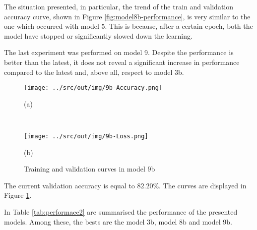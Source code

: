 \documentclass[a4paper,12pt]{article} %
\begin{document}
	The situation presented, in particular, the trend of the train and 
	validation accuracy curve, shown in Figure \ref{fig:model8b-performance}, 
	is very similar to the one which occurred with model 5. This is because, 
	after a certain epoch, both the model have stopped or significantly slowed 
	down the learning.
	\newline

	The last experiment was performed on model 9. Despite the performance is 
	better than the latest, it does not reveal a significant increase in 
	performance compared to the latest and, above all, respect to model 3b. 
			
	\begin{figure}[htb]
		\begin{minipage}[c]{.49\textwidth}
			\centering
			\texttt{[image: ../src/out/img/9b-Accuracy.png]}
			\caption*{(a)}
		\end{minipage}
		~
		\begin{minipage}[c]{.49\textwidth}
			\centering
			\texttt{[image: ../src/out/img/9b-Loss.png]}
			\caption*{(b)}
		\end{minipage}
		\caption{Training and validation curves in model 9b}
		\label{fig:model9b-performance}
	\end{figure}
	
	The current validation accuracy is equal to $82.20\%$.
	The curves are displayed in Figure \ref{fig:model9b-performance}.
	\newline

	In Table \ref{tab:performace2} are summarised the performance of the 
	presented models. Among these, the bests are the model 3b, 
	model 8b and model 9b. 
\end{document}
